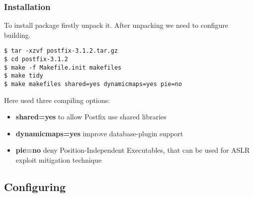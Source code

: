 \documentclass[a4paper,11pt]{article}
\theoremstyle{mytheor}
\begin{document}
\subsubsection{Installation}
To install package firstly unpack it. After unpacking we need to configure building.

\begin{lstlisting}
$ tar -xzvf postfix-3.1.2.tar.gz
$ cd postfix-3.1.2
$ make -f Makefile.init makefiles
$ make tidy
$ make makefiles shared=yes dynamicmaps=yes pie=no
\end{lstlisting}
Here used three compiling options:
\begin{itemize}
    \item \textbf{shared=yes} to allow Postfix use shared libraries
    \item \textbf{dynamicmaps=yes} improve database-plugin support
    \item \textbf{pie=no} deny Position-Independent Executables, that can be used for ASLR exploit mitigation technique
\end{itemize}

\subsection{Configuring}
\end{document}
